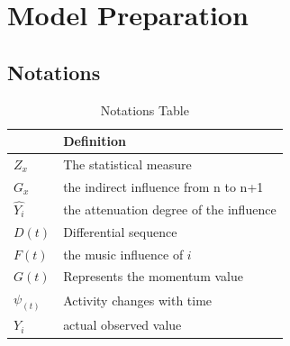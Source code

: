 \documentclass[12pt]{article}%
\begin{document}
	
	\section{ Model Preparation}
	\subsection{Notations}
	\begin{table}[H]
		\centering
		\caption{Notations Table}
		\begin{tabular}{ll}
			\hline
			\hline
			\rowcolor{black!20}
			\multicolumn{1}{c}{\textbf{Notations}} & \textbf{Definition}\\ \hline
			$Z_x$                      & The statistical measure                   \\
			\rowcolor{black!8}
			$G_x$                      & the indirect influence from n to n+1                      \\
			$\hat{Y_i}$                       & the attenuation degree of the influence                      \\
			\rowcolor{black!8}
			$D(t)$                      & Differential sequence                       \\
			$F(t)$                      & the music influence of $i$                      \\
			\rowcolor{black!8}
			$G(t)$                      &     Represents the momentum value         \\
		
			$\psi _(t)$                      & Activity changes with time                     \\
				\rowcolor{black!8}
			$Y_i$                      & actual observed value  \\                     
			\hline
			\hline
		\end{tabular}
	\end{table}
	
\end{document}
